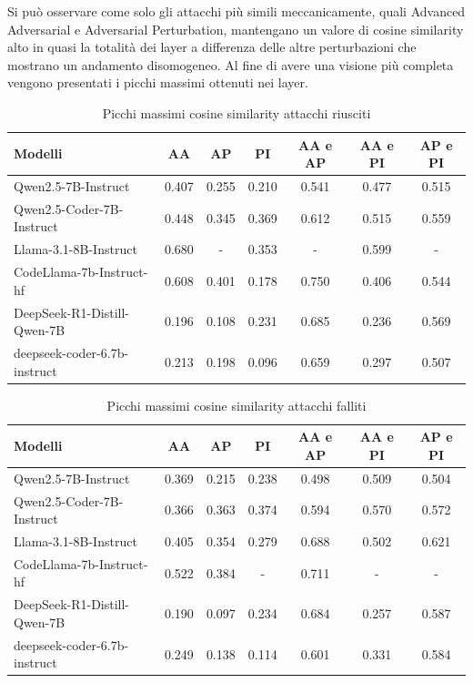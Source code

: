 Si può osservare come solo gli attacchi più simili meccanicamente, quali Advanced Adversarial e Adversarial Perturbation, mantengano un valore di cosine similarity alto in quasi la totalità dei layer a differenza delle altre perturbazioni che mostrano un andamento disomogeneo.
Al fine di avere una visione più completa vengono presentati i picchi massimi ottenuti nei layer.

\begin{table}[H]
    \centering
    \begin{tabular}{l c c c c c c}
        \toprule
        \textbf{Modelli} & \textbf{AA} & \textbf{AP} & \textbf{PI} & \textbf{AA e AP} & \textbf{AA e PI} & \textbf{AP e PI}\\
        \midrule
        Qwen2.5-7B-Instruct                 & 0.407 & 0.255 & 0.210 & 0.541 & 0.477 & 0.515 \\
        Qwen2.5-Coder-7B-Instruct           & 0.448 & 0.345 & 0.369 & 0.612 & 0.515 & 0.559 \\
        Llama-3.1-8B-Instruct         & 0.680 & -     & 0.353 & -     & 0.599 & - \\
        CodeLlama-7b-Instruct-hf       & 0.608 & 0.401 & 0.178 & 0.750 & 0.406 & 0.544 \\
        DeepSeek-R1-Distill-Qwen-7B  & 0.196 & 0.108 & 0.231 & 0.685 & 0.236 & 0.569 \\
        deepseek-coder-6.7b-instruct & 0.213 & 0.198 & 0.096 & 0.659 & 0.297 & 0.507 \\
        \bottomrule
    \end{tabular}
    \vspace{0.2cm}
    \caption{Picchi massimi cosine similarity attacchi riusciti}
    \label{tab:esitone1}
\end{table}

\begin{table}[H]
    \centering
    \begin{tabular}{l c c c c c c}
        \toprule
        \textbf{Modelli} & \textbf{AA} & \textbf{AP} & \textbf{PI} & \textbf{AA e AP} & \textbf{AA e PI} & \textbf{AP e PI}\\
        \midrule
        Qwen2.5-7B-Instruct                 & 0.369 & 0.215 & 0.238 & 0.498 & 0.509 & 0.504 \\
        Qwen2.5-Coder-7B-Instruct           & 0.366 & 0.363 & 0.374 & 0.594 & 0.570 & 0.572 \\
        Llama-3.1-8B-Instruct         & 0.405 & 0.354 & 0.279 & 0.688 & 0.502 & 0.621 \\
        CodeLlama-7b-Instruct-hf       & 0.522 & 0.384 & -     & 0.711 & -     & -     \\
        DeepSeek-R1-Distill-Qwen-7B  & 0.190 & 0.097 & 0.234 & 0.684 & 0.257 & 0.587 \\
        deepseek-coder-6.7b-instruct & 0.249 & 0.138 & 0.114 & 0.601 & 0.331 & 0.584 \\
        \bottomrule
    \end{tabular}
    \vspace{0.2cm}
    \caption{Picchi massimi cosine similarity attacchi falliti}
    \label{tab:esitone2}
\end{table}